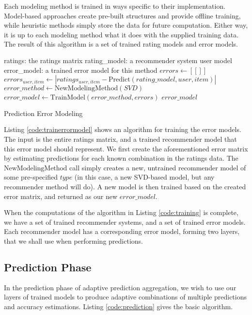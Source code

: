 Each modeling method is trained in ways specific to their implementation. 
Model-based approaches create pre-built structures and provide offline training,
while heuristic methods simply store the data for future computation.
Either way, it is up to each modeling method what it does with the supplied training data.
The result of this algorithm is a set of trained rating models and error models.

\begin{algorithm}
  \begin{algorithmic}[1]
  \REQUIRE ratings: the ratings matrix
  \REQUIRE rating\_model: a recommender system user model
  \ENSURE error\_model: a trained error model for this method
    \STATE $errors \gets [[]]$
        \STATE $errors_{user,item} \gets | ratings_{user,item} - \mathrm{Predict}(rating\_model, user, item) |$
    \ENDFOR 
    \STATE $error\_method \gets \mathrm{NewModelingMethod}(SVD)$
    \STATE $error\_model  \gets \mathrm{TrainModel}(error\_method, errors)$
  \RETURN $error\_model$
  \end{algorithmic}
  \caption[Prediction Error Modeling]{Prediction Error Modeling}
  \label{code:trainerrormodel}
\end{algorithm}

Listing \ref{code:trainerrormodel} shows an algorithm for training the error models.
The input is the entire ratings matrix, and a trained recommender model
that this error model should represent.
We first create the aforementioned error matrix by estimating
predictions for each known combination in the ratings data.
The $\mathrm{NewModelingMethod}$ call simply creates a new, untrained
recommender model of some pre-specified $type$
(in this case, a new SVD-based model, but any recommender method will do).
A new model is then trained based on the created error matrix,
and returned as our new $error\_model$.

When the computations of the algorithm in Listing \ref{code:training} is complete,
we have a set of trained recommender systems, and a set of trained error models.
Each recommender model has a corresponding error model,
forming two layers, that we shall use when performing predictions.


\subsection{Prediction Phase}

In the prediction phase of adaptive prediction aggregation,
we wish to use our layers of trained models to produce adaptive
combinations of multiple predictions and accuracy estimations.
Listing \ref{code:prediction} gives the basic algorithm.

